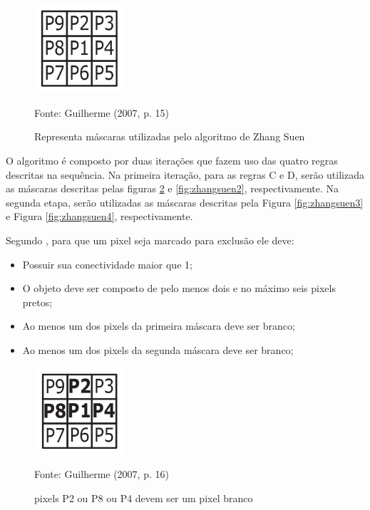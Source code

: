 \documentclass[
	12pt,				%
	oneside,			%
	a4paper,			%
	english,			%
	french,				%
	spanish,			%
	brazil,				%
	]{abntex2}
\begin{document}
\begin{figure}[ht]
\centering
\caption{Representa máscaras utilizadas pelo algoritmo de Zhang Suen}
\includegraphics[width=0.3\textwidth]{imagens/zhangsuen_mascara.png}

Fonte: Guilherme (2007, p. 15)
\label{fig:zhangsuen_mascara}
\end{figure}

O algoritmo é composto por duas iterações que fazem uso das quatro regras descritas na sequência. Na primeira iteração, para as regras C e D, serão utilizada as máscaras descritas pelas figuras  \ref{fig:zhangsuen1} e \ref{fig:zhangsuen2}, respectivamente. Na segunda etapa, serão utilizadas as máscaras descritas pela Figura \ref{fig:zhangsuen3} e Figura \ref{fig:zhangsuen4}, respectivamente.

Segundo \citet{guilherme:2007}, para que um pixel seja marcado para exclusão ele deve:

\begin{itemize}
\item Possuir sua conectividade maior que 1;
\item O objeto deve ser composto de pelo menos dois e no máximo seis pixels pretos;
\item Ao menos um dos pixels da primeira máscara deve ser branco;
\item Ao menos um dos pixels da segunda máscara deve ser branco;
\end{itemize}


\begin{figure}[ht]
\centering
\caption{pixels P2 ou P8 ou P4 devem ser um pixel branco}
\includegraphics[width=0.3\textwidth]{imagens/zhangsuen1.png}

Fonte: Guilherme (2007, p. 16)
\label{fig:zhangsuen1}
\end{figure}
\end{document}

